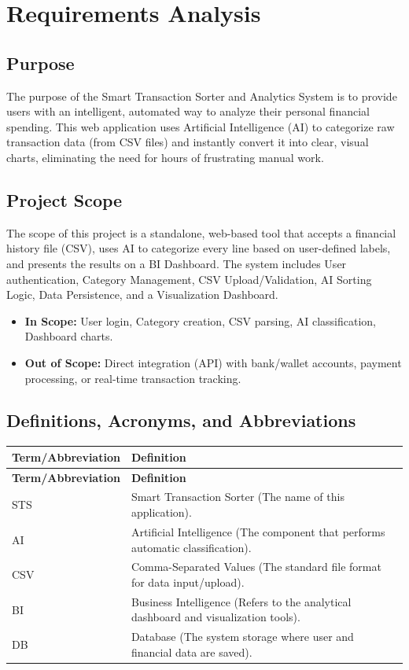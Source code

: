 
\chapter{Requirements Analysis}

\section{Purpose}
The purpose of the Smart Transaction Sorter and Analytics System is to provide users with an intelligent, automated way to analyze their personal financial spending. This web application uses Artificial Intelligence (AI) to categorize raw transaction data (from CSV files) and instantly convert it into clear, visual charts, eliminating the need for hours of frustrating manual work.

\section{Project Scope}
The scope of this project is a standalone, web-based tool that accepts a financial history file (CSV), uses AI to categorize every line based on user-defined labels, and presents the results on a BI Dashboard. The system includes User authentication, Category Management, CSV Upload/Validation, AI Sorting Logic, Data Persistence, and a Visualization Dashboard.

\begin{itemize}
	\item \textbf{In Scope:} User login, Category creation, CSV parsing, AI classification, Dashboard charts.
	\item \textbf{Out of Scope:} Direct integration (API) with bank/wallet accounts, payment processing, or real-time transaction tracking.
\end{itemize}

\section{Definitions, Acronyms, and Abbreviations}
\renewcommand{\arraystretch}{1.5}
\begin{longtable}{|p{4cm}|p{10.5cm}|}
	\hline
	\textbf{Term/Abbreviation} & \textbf{Definition} \\
	\hline
	\endfirsthead
	\hline
	\textbf{Term/Abbreviation} & \textbf{Definition} \\
	\hline
	\endhead
	STS & Smart Transaction Sorter (The name of this application). \\ \hline
	AI & Artificial Intelligence (The component that performs automatic classification). \\ \hline
	CSV & Comma-Separated Values (The standard file format for data input/upload). \\ \hline
	BI & Business Intelligence (Refers to the analytical dashboard and visualization tools). \\ \hline
	DB & Database (The system storage where user and financial data are saved). \\ \hline
\end{longtable}

